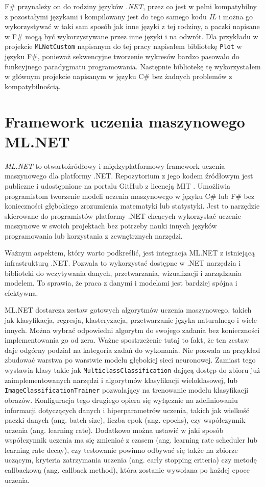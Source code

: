 F\# przynależy on do rodziny języków \emph{.NET}, przez co jest w pełni kompatybilny z pozostałymi językami i kompilowany jest do tego samego kodu \emph{IL} i można go wykorzystywać w taki sam sposób jak inne języki z tej rodziny, a paczki napisane w F\# mogą być wykorzystywane przez inne języki i na odwrót.
Dla przykładu w projekcie \lstinline{MLNetCustom} napisanym do tej pracy napisałem bibliotekę \lstinline{Plot} w języku F\#, ponieważ sekwencyjne tworzenie wykresów bardzo pasowało do funkcyjnego paradygmatu programowania.
Następnie bibliotekę tę wykorzystałem w głównym projekcie napisanym w języku C\# bez żadnych problemów z kompatybilnością.

\section{Framework uczenia maszynowego ML.NET}
\label{sec:ml-net}

\emph{ML.NET} to otwartoźródłowy i międzyplatformowy framework uczenia maszynowego dla platformy .NET.
Repozytorium z jego kodem źródłowym jest publiczne i udostępnione na portalu GitHub z licencją MIT \cite{dotnet-machinelearning-repo}.
Umożliwia programistom tworzenie modeli uczenia maszynowego w języku C\# lub F\# bez konieczności głębokiego zrozumienia matematyki lub statystyki.
Jest to narzędzie skierowane do programistów platformy .NET chcących wykorzystać uczenie maszynowe w swoich projektach bez potrzeby nauki innych języków programowania lub korzystania z zewnętrznych narzędzi.

Ważnym aspektem, który warto podkreślić, jest integracja ML.NET z istniejącą infrastrukturą .NET.
Pozwala to wykorzystać dostępne w .NET narzędzia i biblioteki do wczytywania danych, przetwarzania, wizualizacji i zarządzania modelem.
To sprawia, że praca z danymi i modelami jest bardziej spójna i efektywna.

ML.NET dostarcza zestaw gotowych algorytmów uczenia maszynowego, takich jak klasyfikacja, regresja, klasteryzacja, przetwarzanie języka naturalnego i wiele innych.
Można wybrać odpowiedni algorytm do swojego zadania bez konieczności implementowania go od zera.
Ważne spostrzeżenie tutaj to fakt, że ten zestaw daje odgórny podział na kategoria zadań do wykonania.
Nie pozwala na przykład zbudować warstwa po warstwie modelu głębokiej sieci neuronowej.
Zamiast tego wystawia klasy takie jak \lstinline{MulticlassClassification} dającą dostęp do zbioru już zaimplementowanych narzędzi i algorytmów klasyfikacji wieloklasowej, lub \lstinline{ImageClassificationTrainer} pozwalający na trenowanie modelu klasyfikacji obrazów.
Konfiguracja tego drugiego opiera się wyłącznie na zdefiniowaniu informacji dotyczących danych i hiperparametrów uczenia, takich jak wielkość paczki danych (ang. batch size), liczba epok (ang. epochs), czy współczynnik uczenia (ang. learning rate).
Dodatkowo można ustawić w jaki sposób współczynnik uczenia ma się zmieniać z czasem (ang. learning rate scheduler lub learning rate decay), czy testowanie powinno odbywać się także na zbiorze uczącym, kryteria zatrzymania uczenia (ang. early stopping criteria) czy metodę callbackową (ang. callback method), która zostanie wywołana po każdej epoce uczenia.

